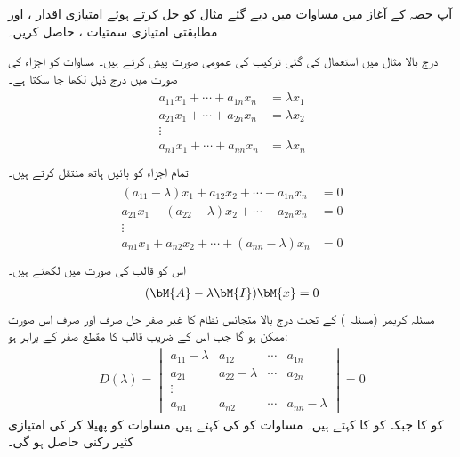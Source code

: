 آپ حصہ  کے آغاز میں مساوات  میں دیے گئے مثال کو حل کرتے ہوئے  امتیازی اقدار ،  اور  مطابقتی امتیازی سمتیات ،  حاصل کریں۔

درج بالا مثال میں استعمال کی گئی ترکیب کی عمومی صورت پیش کرتے ہیں۔ مساوات  کو اجزاء کی صورت میں درج ذیل لکھا جا سکتا ہے۔
\begin{gather}
\begin{aligned}\label{مساوات_امتیازی_متجانس_نظام_الف}
a_{11}x_1+\cdots +a_{1n}x_n&=\lambda x_1\\
a_{21}x_1+\cdots +a_{2n}x_n&=\lambda x_2\\
\vdots&\\
a_{n1}x_1+\cdots +a_{nn}x_n&=\lambda x_n\\
\end{aligned}
\end{gather}
تمام اجزاء کو بائیں ہاتھ منتقل کرتے ہیں۔
\begin{gather}
\begin{aligned}\label{مساوات_امتیازی_متجانس_نظام_ب}
(a_{11}-\lambda)x_1+a_{12}x_2+\cdots +a_{1n}x_n&=0\\
a_{21}x_1+(a_{22}-\lambda)x_2+\cdots +a_{2n}x_n&=0\\
\vdots&\\
a_{n1}x_1+a_{n2}x_2+\cdots +(a_{nn}-\lambda)x_n&=0\\
\end{aligned}
\end{gather}
اس کو قالب کی صورت میں لکھتے ہیں۔
\begin{align}\label{مساوات_امتیازی_متجانس_نظام_پ}
(\bM{A}-\lambda \bM{I})\bM{x}=0
\end{align}
مسئلہ کریمر (مسئلہ ) کے تحت درج بالا متجانس نظام کا غیر صفر حل صرف اور صرف اس صورت ممکن ہو گا جب  اس کے  ضریب  قالب کا مقطع صفر کے برابر ہو:
\begin{align}\label{مساوات_امتیازی_متجانس_نظام_ت}
D(\lambda)=\begin{vmatrix} a_{11}-\lambda & a_{12}&\cdots & a_{1n} \\ a_{21}& a_{22}-\lambda&\cdots & a_{2n}\\ \vdots \\ a_{n1}& a_{n2}&\cdots & a_{nn}-\lambda \end{vmatrix}=0
\end{align} 
 کو  کا   جبکہ   کو  کا  کہتے ہیں۔ مساوات  کو  کی  کہتے ہیں۔مساوات  کو پھیلا کر  کی امتیازی کثیر رکنی حاصل ہو گی۔

